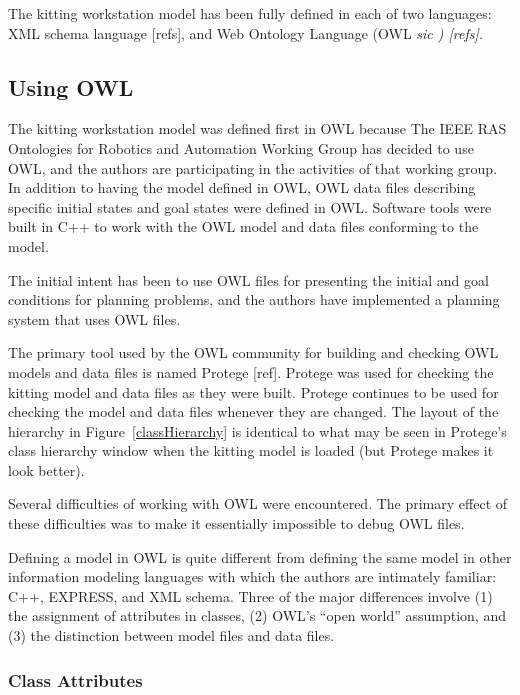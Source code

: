 The kitting workstation model has been fully defined in each of two
languages: XML schema language [refs], and Web Ontology Language (OWL
\it sic \rm) [refs].

\subsection{Using OWL}

The kitting workstation model was defined first in OWL because The IEEE RAS
Ontologies for Robotics and Automation Working Group has decided to use
OWL, and the authors are participating in the activities of that working
group. In addition to having the model defined in OWL, OWL data files
describing specific initial states and goal states were defined in OWL.
Software tools were built in C++ to work with the OWL model and data
files conforming to the model.

The initial intent has been to use OWL files for presenting the initial and
goal conditions for planning problems, and the authors have implemented a
planning system that uses OWL files.

The primary tool used by the OWL community for building and checking OWL
models and data files is named Protege [ref]. Protege was used for checking
the kitting model and data files as they were built. Protege continues to
be used for checking the model and data files whenever they are
changed. The layout of the hierarchy in Figure~\ref{classHierarchy} is
identical to what may be seen in Protege's class hierarchy window when the
kitting model is loaded (but Protege makes it look better).

Several difficulties of working with OWL were encountered. The primary
effect of these difficulties was to make it essentially impossible to
debug OWL files.

Defining a model in OWL is quite different from defining the same model in
other information modeling languages with which the authors are intimately
familiar: C++, EXPRESS, and XML schema. Three of the major differences
involve (1) the assignment of attributes in classes, (2) OWL's ``open
world'' assumption, and (3) the distinction between model files and data
files.\\

\subsubsection{Class Attributes}

